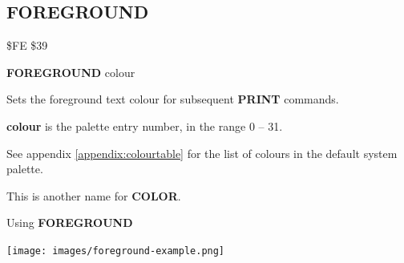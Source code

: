 
\newpage
\subsection{FOREGROUND}
\begin{description}[leftmargin=2cm,style=nextline]
\item [Token:]    \$FE \$39

\item [Format:]   {\bf FOREGROUND} colour

\item [Usage:]    Sets the foreground text colour for subsequent {\bf PRINT} commands.

                  {\bf colour} is the palette entry number, in the range 0 -- 31.

                  See appendix \vref{appendix:colourtable} for the list of colours in the default system palette.

\item [Remarks:]  This is another name for {\bf COLOR}.

\item [Example:]  Using {\bf FOREGROUND}

\item \begin{center}\texttt{[image: images/foreground-example.png]}\end{center}

\end{description}


\newpage
